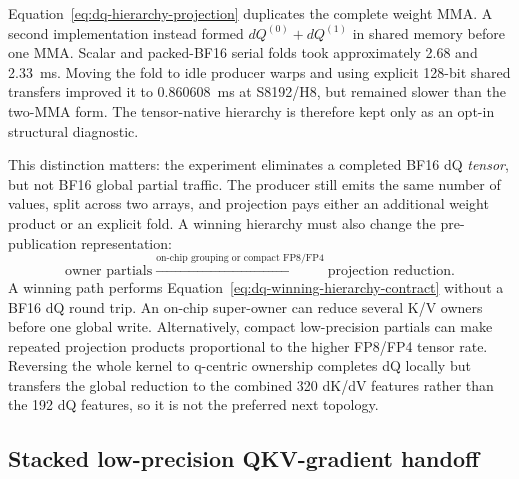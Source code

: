 Equation~\ref{eq:dq-hierarchy-projection} duplicates the complete weight MMA.
A second implementation instead formed $dQ^{(0)}+dQ^{(1)}$ in shared memory
before one MMA.  Scalar and packed-BF16 serial folds took approximately 2.68
and 2.33~ms.  Moving the fold to idle producer warps and using explicit
128-bit shared transfers improved it to 0.860608~ms at S8192/H8, but remained
slower than the two-MMA form.  The tensor-native hierarchy is therefore kept
only as an opt-in structural diagnostic.

This distinction matters: the experiment eliminates a completed BF16 dQ
\emph{tensor}, but not BF16 global partial traffic.  The producer still emits
the same number of values, split across two arrays, and projection pays either
an additional weight product or an explicit fold.  A winning hierarchy must
also change the pre-publication representation:
\begin{equation}
  \text{owner partials}
  \xrightarrow{\text{on-chip grouping or compact FP8/FP4}}
  \text{projection reduction}.
  \label{eq:dq-winning-hierarchy-contract}
\end{equation}
A winning path performs Equation~\ref{eq:dq-winning-hierarchy-contract}
without a BF16 dQ round trip.  An on-chip super-owner can reduce several K/V
owners before one global write.
Alternatively, compact low-precision partials can make repeated projection
products proportional to the higher FP8/FP4 tensor rate.  Reversing the whole
kernel to q-centric ownership completes dQ locally but transfers the global
reduction to the combined 320 dK/dV features rather than the 192 dQ features,
so it is not the preferred next topology.

\subsection{Stacked low-precision QKV-gradient handoff}

